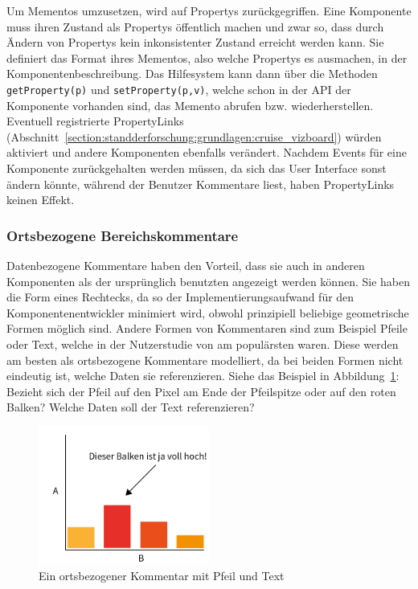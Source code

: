 \documentclass[
	headsepline,
	footsepline,
	fontsize=12pt,
	bibliography=totoc
]{scrbook}
\begin{document}
Um Mementos umzusetzen, wird auf Propertys zurückgegriffen. Eine Komponente muss ihren Zustand als Propertys öffentlich machen und zwar so, dass durch Ändern von Propertys kein inkonsistenter Zustand erreicht werden kann. Sie definiert das Format ihres Mementos, also welche Propertys es ausmachen, in der Komponentenbeschreibung. Das Hilfesystem kann dann über die Methoden \texttt{getProperty(p)} und \texttt{setProperty(p,v)}, welche schon in der API der Komponente vorhanden sind, das Memento abrufen bzw. wiederherstellen. Eventuell registrierte PropertyLinks (Abschnitt~\ref{section:standderforschung:grundlagen:cruise_vizboard}) würden aktiviert und andere Komponenten ebenfalls verändert. Nachdem Events für eine Komponente zurückgehalten werden müssen, da sich das User Interface sonst ändern könnte, während der Benutzer Kommentare liest, haben PropertyLinks keinen Effekt.

\subsubsection{Ortsbezogene Bereichskommentare}

Datenbezogene Kommentare haben den Vorteil, dass sie auch in anderen Komponenten als der ursprünglich benutzten angezeigt werden können. Sie haben die Form eines Rechtecks, da so der Implementierungsaufwand für den Komponentenentwickler minimiert wird, obwohl prinzipiell beliebige geometrische Formen möglich sind. Andere Formen von Kommentaren sind zum Beispiel Pfeile oder Text, welche in der Nutzerstudie von \cite{Heer2007} am populärsten waren. Diese werden am besten als ortsbezogene Kommentare modelliert, da bei beiden Formen nicht eindeutig ist, welche Daten sie referenzieren. Siehe das Beispiel in Abbildung~\ref{figure:ortsbezogen}: Bezieht sich der Pfeil auf den Pixel am Ende der Pfeilspitze oder auf den roten Balken? Welche Daten soll der Text referenzieren?

\begin{figure}[htbp]
   \centering
   \includegraphics[width=0.5\textwidth]{images/konzeption-ortsbezogen.png}
   \caption{Ein ortsbezogener Kommentar mit Pfeil und Text}
   \label{figure:ortsbezogen}
\end{figure}
\end{document}
